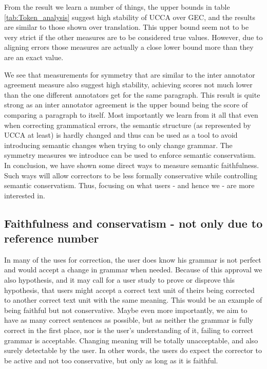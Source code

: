 		
		From the result we learn a number of things, the upper
		bounds in table \ref{tab:Token_analysis} suggest high stability of UCCA over GEC, and the results are similar to those shown over
		translation. This upper bound seem not to be very strict if the other
		measures are to be considered true values. 
		However, due to aligning errors those measures are actually a close lower bound more than they are an exact value.
		
		We see that measurements for symmetry that are similar to the inter
		annotator agreement measure also suggest high stability, achieving
		scores not much lower than the one different annotators get for the
		same paragraph. This result is quite strong as an inter annotator
		agreement is the upper bound being the score of comparing a paragraph to itself. 
		Most importantly we learn from it all that even when correcting grammatical errors, the semantic structure (as represented by UCCA at least) is hardly changed and thus can be used as a tool to avoid introducing semantic changes when trying to only change grammar. 
		The symmetry measures we introduce can be used to enforce semantic conservatism.
		In conclusion, we have shown some direct ways to measure
		semantic faithfulness. Such ways will allow correctors to be less formally conservative while controlling semantic conservatism. Thus, focusing on what users - and hence we - are more interested in.
		
		\subsection{Faithfulness and conservatism - not only due to reference number}
		In many of the uses for correction,
		the user does know his grammar is not perfect and would accept
		a change in grammar when needed. Because of this approval we also
		hypothesis, and it may call for a user study to prove or disprove
		this hypothesis, that users might accept a correct text unit of theirs
		being corrected to another correct text unit with the same meaning.
		This would be an example of being faithful but not conservative.
		Maybe even more importantly, we aim to have as many correct sentences
		as possible, but as neither the grammar is fully correct in the first place,
		nor is the user's understanding of it, failing to correct grammar
		is acceptable. Changing meaning will be totally unacceptable, and
		also surely detectable by the user. In other words, the users do expect
		the corrector to be active and not too conservative, but
		only as long as it is faithful. 
		
